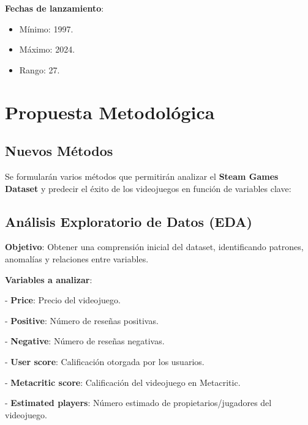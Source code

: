 \documentclass[
  letterpaper,
  DIV=11,
  numbers=noendperiod]{scrreprt}
\begin{document}
\begin{tcolorbox}[enhanced jigsaw, toprule=.15mm, rightrule=.15mm, colframe=quarto-callout-color-frame, colback=white, left=2mm, breakable, arc=.35mm, opacityback=0, bottomrule=.15mm, leftrule=.75mm]

\textbf{Fechas de lanzamiento}:

\begin{itemize}
\item
  Mínimo: 1997.
\item
  Máximo: 2024.
\item
  Rango: 27.\\
\end{itemize}

\end{tcolorbox}

\section{Propuesta Metodológica}\label{propuesta-metodoluxf3gica}

\subsection{Nuevos Métodos}\label{nuevos-muxe9todos}

Se formularán varios métodos que permitirán analizar el \textbf{Steam
Games Dataset} y predecir el éxito de los videojuegos en función de
variables clave:

\subsection{Análisis Exploratorio de Datos
(EDA)}\label{anuxe1lisis-exploratorio-de-datos-eda}

\textbf{Objetivo}: Obtener una comprensión inicial del dataset,
identificando patrones, anomalías y relaciones entre variables.

\textbf{Variables a analizar}:

- \textbf{Price}: Precio del videojuego.

- \textbf{Positive}: Número de reseñas positivas.

- \textbf{Negative}: Número de reseñas negativas.

- \textbf{User score}: Calificación otorgada por los usuarios.

- \textbf{Metacritic score}: Calificación del videojuego en Metacritic.

- \textbf{Estimated players}: Número estimado de propietarios/jugadores
del videojuego.
\end{document}
